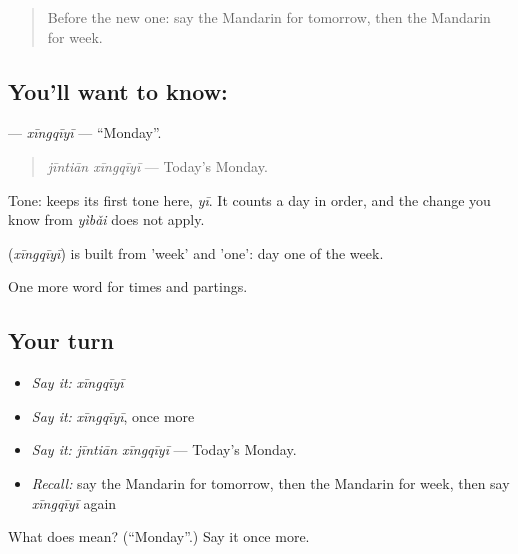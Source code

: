 \label{lesson:ZH-C46-xingqiyi}



\begin{quote}
Before the new one: say the Mandarin for tomorrow, then the Mandarin for week.
\end{quote}

\subsection*{You'll want to know: }
\textbf{} — \emph{xīngqīyī} — \textquotedblleft{}Monday\textquotedblright{}.

\begin{quote}
\textbf{} \emph{jīntiān xīngqīyī} — Today's Monday.
\end{quote}

Tone:  keeps its first tone here, \emph{yī}. It counts a day in order, and the change you know from \emph{yìbǎi} does not apply.

\begin{cousinweb}
\textbf{} (\emph{xīngqīyī}) is built from  'week' and  'one': day one of the week.
\end{cousinweb}

\begin{grammarlens}[title={What you've built}]
One more word for times and partings.
\end{grammarlens}

\subsection*{Your turn}
\begin{itemize}
\raggedright
  \item \emph{Say it:} \emph{xīngqīyī}
  \item \emph{Say it:} \emph{xīngqīyī}, once more
  \item \emph{Say it:} \emph{jīntiān xīngqīyī} — Today's Monday.
  \item \emph{Recall:} say the Mandarin for tomorrow, then the Mandarin for week, then say \emph{xīngqīyī} again
\end{itemize}

\begin{tcolorbox}[breakable,colback=teal!4,colframe=teal!35!black,title={Before you move on}]
What does  mean? (\textquotedblleft{}Monday\textquotedblright{}.) Say it once more.
\end{tcolorbox}
